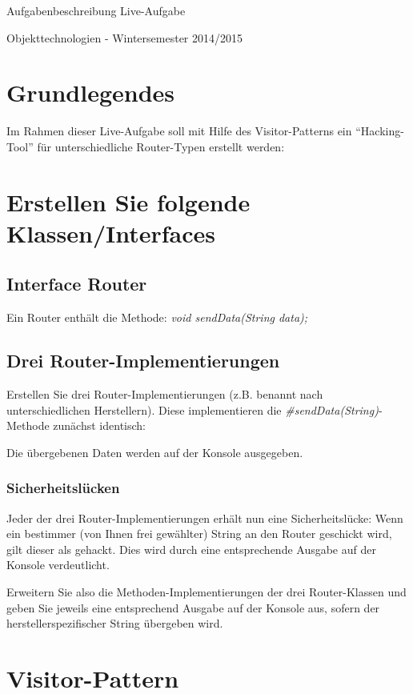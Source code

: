 \documentclass[oneside,a4paper]{scrartcl}
\author{Johannes Schneider}
\begin{document}
\centerline{\sc \large Aufgabenbeschreibung Live-Aufgabe}
\vspace{.5pc}
\centerline{\sc Objekttechnologien - Wintersemester 2014/2015}
\vspace{2pc}



\section{Grundlegendes}

Im Rahmen dieser Live-Aufgabe soll mit Hilfe des Visitor-Patterns ein \enquote{Hacking-Tool} für
unterschiedliche Router-Typen erstellt werden:


\section{Erstellen Sie folgende Klassen/Interfaces}
\subsection{Interface Router}

Ein Router enthält die Methode: \emph{void sendData(String data);}

\subsection{Drei Router-Implementierungen}
Erstellen Sie drei Router-Implementierungen (z.B. benannt nach unterschiedlichen Herstellern). Diese
implementieren die \emph{\#sendData(String)}-Methode zunächst identisch:

Die übergebenen Daten werden auf der Konsole ausgegeben.

\subsubsection{Sicherheitslücken}
Jeder der drei Router-Implementierungen erhält nun eine Sicherheitslücke:
Wenn ein bestimmer (von Ihnen frei gewählter) String an den Router geschickt wird, 
gilt dieser als gehackt. Dies wird durch eine entsprechende Ausgabe auf der Konsole verdeutlicht.

Erweitern Sie also die Methoden-Implementierungen der drei Router-Klassen und geben Sie jeweils eine entsprechend Ausgabe auf der Konsole
aus, sofern der herstellerspezifischer String übergeben wird.


\section{Visitor-Pattern}
\end{document}
